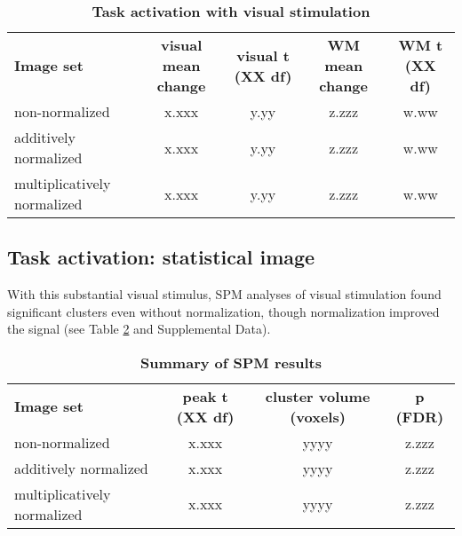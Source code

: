 \begin{table}
\begin{tabular}{lcccc}
  \textbf{Image set} & \textbf{visual mean change} & \textbf{visual t (XX df)} &        \textbf{WM mean change} & \textbf{WM t (XX df)} \\
  non-normalized & x.xxx & y.yy & z.zzz & w.ww \\
  additively normalized & x.xxx & y.yy & z.zzz & w.ww \\
  multiplicatively normalized & x.xxx & y.yy & z.zzz & w.ww \\
\end{tabular}
\caption{\textbf{Task activation with visual stimulation}}
\label{table:taskVOI}
\end{table}

\subsection{Task activation: statistical image} With this substantial visual stimulus, SPM analyses of visual stimulation found significant clusters even without normalization, though normalization improved the signal (see Table \ref{table:SPMresults} and Supplemental Data).

\begin{table}
\begin{tabular}{lccc}
  \textbf{Image set} & \textbf{peak t (XX df)} & \textbf{cluster volume (voxels)} & \textbf{p (FDR)} \\
  non-normalized & x.xxx & yyyy & z.zzz \\
  additively normalized & x.xxx & yyyy & z.zzz \\
  multiplicatively normalized & x.xxx & yyyy & z.zzz \\
\end{tabular}
\caption{\textbf{Summary of SPM results}}
\label{table:SPMresults}
\end{table}
